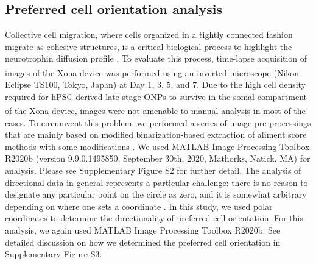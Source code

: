 \documentclass[review]{elsarticle}
\begin{document}
\subsection {Preferred cell orientation analysis}
Collective cell migration, where cells organized in a tightly connected fashion migrate as cohesive structures, is a critical biological process to highlight the neurotrophin diffusion profile \cite{Mazalan2020}. To evaluate this process, time-lapse acquisition of images of the Xona\textsuperscript{\texttrademark} device was performed using an inverted microscope (Nikon Eclipse TS100, Tokyo, Japan) at Day 1, 3, 5, and 7. Due to the high cell density required for hPSC-derived late stage ONPs to survive in the somal compartment of the Xona\textsuperscript{\texttrademark} device, images were not amenable to manual analysis in most of the cases. To circumvent this problem, we performed a series of image pre-processings that are mainly based on modified binarization-based extraction of aliment score methods with some modifications \cite{Xu2011}. We used MATLAB Image Processing Toolbox R2020b (version 9.9.0.1495850, September 30th, 2020, Mathorks, Natick, MA) for analysis. Please see Supplementary Figure S2 for further detail. The analysis of directional data in general represents a particular challenge: there is no reason to designate any particular point on the circle as zero, and it is somewhat arbitrary depending on where one sets a coordinate \cite{Batschelet1981,Berens2009}. In this study, we used polar coordinates to determine the directionality of preferred cell orientation.  For this analysis, we again used MATLAB Image Processing Toolbox R2020b. See detailed discussion on how we determined the preferred cell orientation in Supplementary Figure S3.
\end{document}
